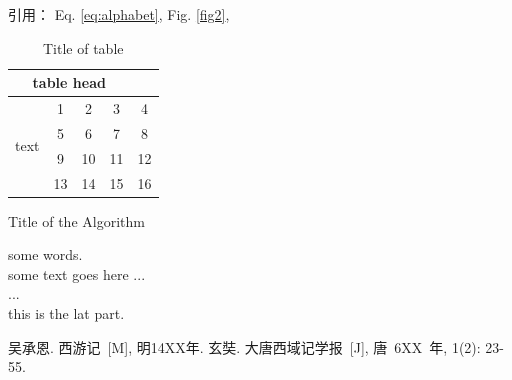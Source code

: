 \documentclass[UTF8,a4paper,11pt,onecolumn,twoside]{ctexart}
\begin{document}
\begin{multicols}{2}
引用： Eq. \eqref{eq:alphabet}, Fig. \ref{fig2},  \\

\begin{table}[H]
	\caption{Title of table} \label{tab:table}
	\centering
	\addtolength{\tabcolsep}{-0mm} %
	\begin{tabular}{ccccc}
		\toprule[0.75pt]	%
		\multicolumn{4}{c}{table head} \\
		\midrule[0.5pt]	%
		\multirow{4}{*}{text} & 1 & 2 & 3 & 4 \\  %
		& 5 & 6 & 7 & 8 \\
		\cmidrule[0.5pt]{2-4}	%
		& 9 & 10 & 11 & 12 \\
		& 13 & 14 & 15 & 16 \\
		\bottomrule[0.75pt]	%
	\end{tabular}
\end{table}

\begin{algorithm}[H]
	\caption{Title of the Algorithm}
	\label{algo:ref}
	\begin{algorithmic}[1]
		\REQUIRE some words.  %
		\ENSURE ~\\           %
		some text goes here ... \\
		\STATE ... \\  %
		\ENDWHILE
		\RETURN this is the lat part.  %
	\end{algorithmic}
\end{algorithm}



\small
\begin{thebibliography}{99}
	\setlength{\parskip}{0pt}  %
	吴承恩. 西游记~[M], 明14XX年.
	 玄奘. 大唐西域记学报~[J], 唐~6XX~年, 1(2): 23-55.
	

\end{thebibliography}
\end{multicols}
\end{document}
